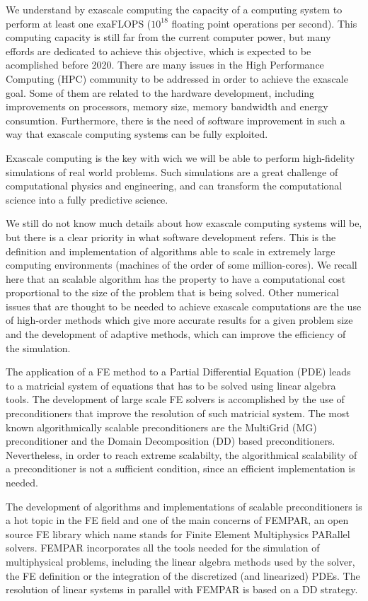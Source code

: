 We understand by exascale computing the capacity of a computing system to perform at least one exaFLOPS ($ 10^{18} $ floating point operations per second). This computing capacity is still far from the current computer power, but many effords are dedicated to achieve this objective, which is expected to be acomplished before 2020. There are many issues in the High Performance Computing (HPC) community to be addressed in order to achieve the exascale goal. Some of them are related to the hardware development, including improvements on processors, memory size, memory bandwidth and energy consumtion. Furthermore, there is the need of software improvement in such a way that exascale computing systems can be fully exploited.

Exascale computing is the key with wich we will be able to perform high-fidelity simulations of real world problems. Such simulations are a great challenge of computational physics and engineering, and can transform the computational science into a fully predictive science.

We still do not know much details about how exascale computing systems will be, but there is a clear priority in what software development refers. This is the definition and implementation of algorithms able to scale in extremely large computing environments (machines of the order of some million-cores). We recall here that an scalable algorithm has the property to have a computational cost proportional to the size of the problem that is being solved. Other numerical issues that are thought to be needed to achieve exascale computations are the use of high-order methods which give more accurate results for a given problem size and the development of adaptive methods, which can improve the efficiency of the simulation.

The application of a FE method to a Partial Differential Equation (PDE) leads to a matricial system of equations that has to be solved using linear algebra tools. The development of large scale FE solvers is accomplished by the use of preconditioners that improve the resolution of such matricial system. The most known algorithmically scalable preconditioners are the MultiGrid (MG) preconditioner and the Domain Decomposition (DD) based preconditioners. Nevertheless, in order to reach extreme scalabilty, the algorithmical scalability of a preconditioner is not a sufficient condition, since an efficient implementation is needed. 

The development of algorithms and implementations of scalable preconditioners is a hot topic in the FE field and one of the main concerns of FEMPAR, an open source FE library which name stands for Finite Element Multiphysics PARallel solvers. FEMPAR incorporates all the tools needed for the simulation of multiphysical problems, including the linear algebra methods used by the solver, the FE definition or the integration of the discretized (and linearized) PDEs. The resolution of linear systems in parallel with FEMPAR is based on a DD strategy.

